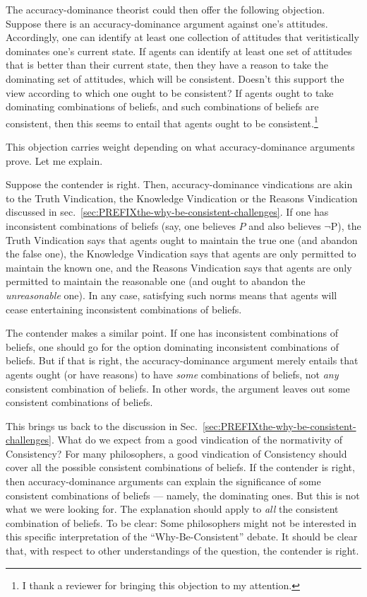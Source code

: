 \documentclass[
]{article}
\begin{document}
The accuracy-dominance theorist could then offer the following
objection. Suppose there is an accuracy-dominance argument against one's
attitudes. Accordingly, one can identify at least one collection of
attitudes that veritistically dominates one's current state. If agents
can identify at least one set of attitudes that is better than their
current state, then they have a reason to take the dominating set of
attitudes, which will be consistent. Doesn't this support the view
according to which one ought to be consistent? If agents ought to take
dominating combinations of beliefs, and such combinations of beliefs are
consistent, then this seems to entail that agents ought to be
consistent.\footnote{I thank a reviewer for bringing this objection to
  my attention.}

This objection carries weight depending on what accuracy-dominance
arguments prove. Let me explain.

Suppose the contender is right. Then, accuracy-dominance vindications
are akin to the Truth Vindication, the Knowledge Vindication or the
Reasons Vindication discussed in
sec.~\ref{sec:PREFIXthe-why-be-consistent-challenges}. If one has
inconsistent combinations of beliefs (say, one believes \(P\) and also
believes \(\neg\)P), the Truth Vindication says that agents ought to
maintain the true one (and abandon the false one), the Knowledge
Vindication says that agents are only permitted to maintain the known
one, and the Reasons Vindication says that agents are only permitted to
maintain the reasonable one (and ought to abandon the
\emph{unreasonable} one). In any case, satisfying such norms means that
agents will cease entertaining inconsistent combinations of beliefs.

The contender makes a similar point. If one has inconsistent
combinations of beliefs, one should go for the option dominating
inconsistent combinations of beliefs. But if that is right, the
accuracy-dominance argument merely entails that agents ought (or have
reasons) to have \emph{some} combinations of beliefs, not \emph{any}
consistent combination of beliefs. In other words, the argument leaves
out some consistent combinations of beliefs.

This brings us back to the discussion in
Sec.~\ref{sec:PREFIXthe-why-be-consistent-challenges}. What do we expect
from a good vindication of the normativity of Consistency? For many
philosophers, a good vindication of Consistency should cover all the
possible consistent combinations of beliefs. If the contender is right,
then accuracy-dominance arguments can explain the significance of some
consistent combinations of beliefs --- namely, the dominating ones. But
this is not what we were looking for. The explanation should apply to
\emph{all} the consistent combination of beliefs. To be clear: Some
philosophers might not be interested in this specific interpretation of
the ``Why-Be-Consistent'' debate. It should be clear that, with respect
to other understandings of the question, the contender is right.
\end{document}
